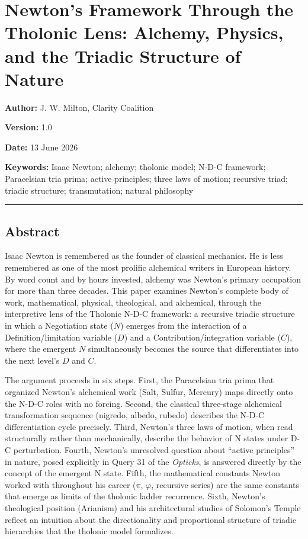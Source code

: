 \documentclass[
  11pt,
  letterpaper,
]{article}
\author{}
\date{}
\begin{document}
\section{Newton's Framework Through the Tholonic Lens: Alchemy, Physics,
and the Triadic Structure of
Nature}\label{newtons-framework-through-the-tholonic-lens-alchemy-physics-and-the-triadic-structure-of-nature}

\textbf{Author:} J. W. Milton, Clarity Coalition

\textbf{Version:} 1.0

\textbf{Date:} 13 June 2026

\textbf{Keywords:} Isaac Newton; alchemy; tholonic model; N-D-C
framework; Paracelsian tria prima; active principles; three laws of
motion; recursive triad; triadic structure; transmutation; natural
philosophy

\begin{center}\rule{0.5\linewidth}{0.5pt}\end{center}

\subsection{Abstract}\label{abstract}

Isaac Newton is remembered as the founder of classical mechanics. He is
less remembered as one of the most prolific alchemical writers in
European history. By word count and by hours invested, alchemy was
Newton's primary occupation for more than three decades. This paper
examines Newton's complete body of work, mathematical, physical,
theological, and alchemical, through the interpretive lens of the
Tholonic N-D-C framework: a recursive triadic structure in which a
Negotiation state (\(N\)) emerges from the interaction of a
Definition/limitation variable (\(D\)) and a Contribution/integration
variable (\(C\)), where the emergent \(N\) simultaneously becomes the
source that differentiates into the next level's \(D\) and \(C\).

The argument proceeds in six steps. First, the Paracelsian tria prima
that organized Newton's alchemical work (Salt, Sulfur, Mercury) maps
directly onto the N-D-C roles with no forcing. Second, the classical
three-stage alchemical transformation sequence (nigredo, albedo, rubedo)
describes the N-D-C differentiation cycle precisely. Third, Newton's
three laws of motion, when read structurally rather than mechanically,
describe the behavior of N states under D-C perturbation. Fourth,
Newton's unresolved question about ``active principles'' in nature,
posed explicitly in Query 31 of the \emph{Opticks}, is answered directly
by the concept of the emergent N state. Fifth, the mathematical
constants Newton worked with throughout his career (\(\pi\),
\(\varphi\), recursive series) are the same constants that emerge as
limits of the tholonic ladder recurrence. Sixth, Newton's theological
position (Arianism) and his architectural studies of Solomon's Temple
reflect an intuition about the directionality and proportional structure
of triadic hierarchies that the tholonic model formalizes.
\end{document}
